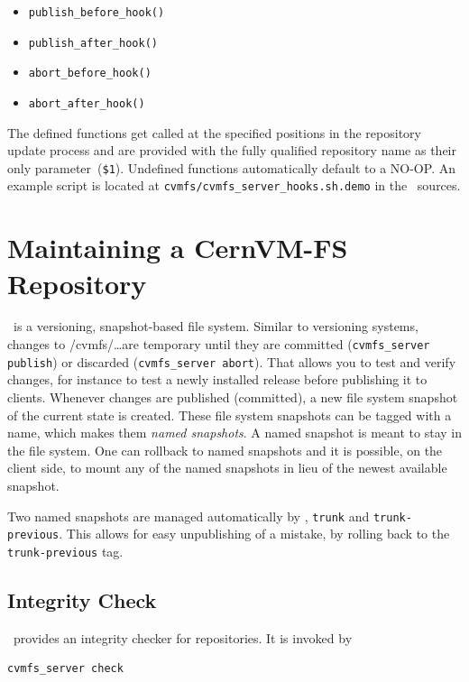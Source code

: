 \begin{itemize}
	\item \texttt{publish\_before\_hook()}
	\item \texttt{publish\_after\_hook()}
\end{itemize}
\begin{itemize}
	\item \texttt{abort\_before\_hook()}
	\item \texttt{abort\_after\_hook()}
\end{itemize}
The defined functions get called at the specified positions in the repository update process and are provided with the fully qualified repository name as their only parameter~(\texttt{\$1}).
Undefined functions automatically default to a NO-OP.
An example script is located at \texttt{cvmfs/cvmfs\_server\_hooks.sh.demo} in the \cvmfs\ sources.


\section{Maintaining a CernVM-FS Repository}

\cvmfs\ is a versioning, snapshot-based file system.
Similar to versioning systems, changes to /cvmfs/\dots are temporary until they are committed (\texttt{cvmfs\_server publish}) or discarded (\texttt{cvmfs\_server abort}).
That allows you to test and verify changes, for instance to test a newly installed release before publishing it to clients.
Whenever changes are published (committed), a new file system snapshot of the current state is created.
These file system snapshots can be tagged with a name, which makes them \emph{named snapshots}.
A named snapshot is meant to stay in the file system.
One can rollback to named snapshots and it is possible, on the client side, to mount any of the named snapshots in lieu of the newest available snapshot.

Two named snapshots are managed automatically by \cvmfs, \texttt{trunk} and \texttt{trunk-previous}.
This allows for easy unpublishing of a mistake, by rolling back to the \texttt{trunk-previous} tag.

\subsection{Integrity Check}
\label{sct:checkintegrity}
\cvmfs\ provides an integrity checker for repositories.
It is invoked by
\begin{verbatim}
cvmfs_server check
\end{verbatim}

